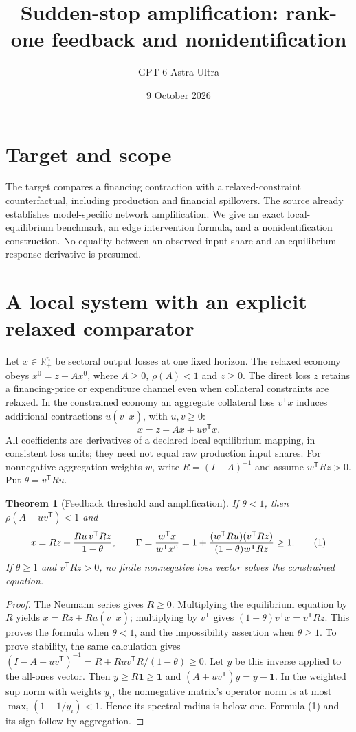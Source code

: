\documentclass[11pt]{article}
\title{Sudden-stop amplification: rank-one feedback and nonidentification}
\author{GPT 6 Astra Ultra}
\date{9 October 2026}
\newtheorem{theorem}{Theorem}
\theoremstyle{definition}
\begin{document}
\maketitle
\section*{Target and scope}
The target compares a financing contraction with a relaxed-constraint
counterfactual, including production and financial spillovers. The source
\cite{mprs} already establishes model-specific network amplification.
We give an exact local-equilibrium benchmark, an edge intervention formula,
and a nonidentification construction. No equality between an observed
input share and an equilibrium response derivative is presumed.

\section*{A local system with an explicit relaxed comparator}
Let $x\in\mathbb R_+^n$ be sectoral output losses at one fixed horizon.
The relaxed economy obeys $x^0=z+Ax^0$, where $A\ge0$,
$\rho(A)<1$ and $z\ge0$. The direct loss $z$ retains a financing-price
or expenditure channel even when collateral constraints are relaxed.
In the constrained economy an aggregate collateral loss $v^{\mathsf T}x$
induces additional contractions $u(v^{\mathsf T}x)$, with $u,v\ge0$:
\[
 x=z+Ax+uv^{\mathsf T}x.
\]
All coefficients are derivatives of a declared local equilibrium mapping,
in consistent loss units; they need not equal raw production input shares.
For nonnegative aggregation weights $w$, write $R=(I-A)^{-1}$ and assume
$w^{\mathsf T}Rz>0$. Put $\theta=v^{\mathsf T}Ru$.

\begin{theorem}[Feedback threshold and amplification]
If $\theta<1$, then $\rho(A+uv^{\mathsf T})<1$ and
\[
 x=Rz+{Ru\,v^{\mathsf T}Rz\over1-\theta},\qquad
 \Gamma={w^{\mathsf T}x\over w^{\mathsf T}x^0}
 =1+{(w^{\mathsf T}Ru)(v^{\mathsf T}Rz)
       \over(1-\theta)w^{\mathsf T}Rz}\ge1. \tag{1}
\]
If $\theta\ge1$ and $v^{\mathsf T}Rz>0$, no finite nonnegative loss
vector solves the constrained equation.
\end{theorem}
\begin{proof}
The Neumann series gives $R\ge0$. Multiplying the equilibrium equation
by $R$ yields $x=Rz+Ru(v^{\mathsf T}x)$; multiplying by $v^{\mathsf T}$
gives $(1-\theta)v^{\mathsf T}x=v^{\mathsf T}Rz$.
This proves the formula when $\theta<1$, and the impossibility assertion
when $\theta\ge1$.
To prove stability, the same calculation gives
$(I-A-uv^{\mathsf T})^{-1}=R+Ru v^{\mathsf T}R/(1-\theta)\ge0$.
Let $y$ be this inverse applied to the all-ones vector. Then $y\ge R\mathbf1
\ge\mathbf1$ and $(A+uv^{\mathsf T})y=y-\mathbf1$.
In the weighted sup norm with weights $y_i$, the nonnegative matrix's
operator norm is at most $\max_i(1-1/y_i)<1$. Hence its spectral radius
is below one. Formula (1) and its sign follow by aggregation.
\end{proof}
\end{document}
